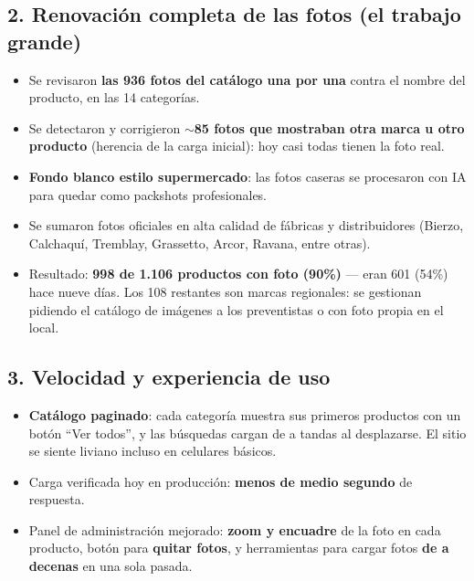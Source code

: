 \documentclass[a4paper,11pt]{article}
\begin{document}
\subsection*{2. Renovaci\'on completa de las fotos (el trabajo grande)}
\begin{itemize}[leftmargin=1.2em, itemsep=2pt]
  \item Se revisaron \textbf{las 936 fotos del cat\'alogo una por una} contra el nombre del
        producto, en las 14 categor\'ias.
  \item Se detectaron y corrigieron \textbf{$\sim$85 fotos que mostraban otra marca u otro
        producto} (herencia de la carga inicial): hoy casi todas tienen la foto real.
  \item \textbf{Fondo blanco estilo supermercado}: las fotos caseras se procesaron con IA
        para quedar como packshots profesionales.
  \item Se sumaron fotos oficiales en alta calidad de f\'abricas y distribuidores
        (Bierzo, Calchaqu\'i, Tremblay, Grassetto, Arcor, Ravana, entre otras).
  \item Resultado: \textbf{998 de 1.106 productos con foto (90\%)} --- eran 601 (54\%) hace
        nueve d\'ias. Los 108 restantes son marcas regionales: se gestionan pidiendo el
        cat\'alogo de im\'agenes a los preventistas o con foto propia en el local.
\end{itemize}

\subsection*{3. Velocidad y experiencia de uso}
\begin{itemize}[leftmargin=1.2em, itemsep=2pt]
  \item \textbf{Cat\'alogo paginado}: cada categor\'ia muestra sus primeros productos con un
        bot\'on ``Ver todos'', y las b\'usquedas cargan de a tandas al desplazarse. El sitio
        se siente liviano incluso en celulares b\'asicos.
  \item Carga verificada hoy en producci\'on: \textbf{menos de medio segundo} de respuesta.
  \item Panel de administraci\'on mejorado: \textbf{zoom y encuadre} de la foto en cada
        producto, bot\'on para \textbf{quitar fotos}, y herramientas para cargar fotos
        \textbf{de a decenas} en una sola pasada.
\end{itemize}
\end{document}
